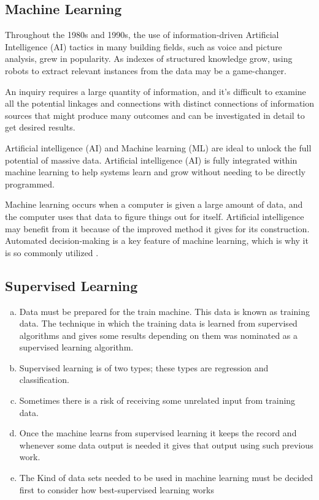 \subsection{Machine Learning}

Throughout the 1980s and 1990s, the use of information-driven Artificial Intelligence (AI) tactics in many building fields, such as voice and picture analysis, grew in popularity. As indexes of structured knowledge grow, using robots to extract relevant instances from the data may be a game-changer.

An inquiry requires a large quantity of information, and it's difficult to examine all the potential linkages and connections with distinct connections of information sources that might produce many outcomes and can be investigated in detail to get desired results.


Artificial intelligence (AI) and Machine learning (ML) are ideal to unlock the full potential of massive data. Artificial intelligence (AI) is fully integrated within machine learning to help systems learn and grow without needing to be directly programmed.

Machine learning occurs when a computer is given a large amount of data, and the computer uses that data to figure things out for itself. Artificial intelligence may benefit from it because of the improved method it gives for its construction. Automated decision-making is a key feature of machine learning, which is why it is so commonly utilized \cite{masood900}.

\subsection{Supervised Learning}

\begin{enumerate}[a)]
    \item Data must be prepared for the train machine. This data is known as training data. The technique in which the training data is learned from supervised algorithms and gives some results depending on them was nominated as a supervised learning algorithm.
    \item Supervised learning is of two types; these types are regression and classification.
    \item Sometimes there is a risk of receiving some unrelated input from training data.
    \item Once the machine learns from supervised learning it keeps the record and whenever some data output is needed it gives that output using such previous work.
    \item The Kind of data sets needed to be used in machine learning must be decided first to consider how best-supervised learning works
\end{enumerate}

